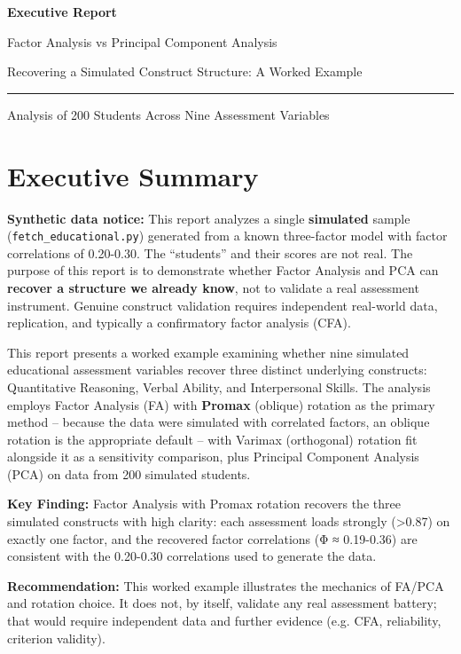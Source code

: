 \documentclass[
]{article}
\author{}
\date{}
\begin{document}
\textbf{ Executive Report }

Factor Analysis vs Principal Component Analysis

Recovering a Simulated Construct Structure: A Worked Example

\begin{center}\rule{0.5\linewidth}{0.5pt}\end{center}

Analysis of 200 Students Across Nine Assessment Variables

\section{Executive Summary}

\textbf{Synthetic data notice:} This report analyzes a single
\textbf{simulated} sample (\texttt{fetch\_educational.py}) generated
from a known three-factor model with factor correlations of 0.20-0.30.
The ``students'' and their scores are not real. The purpose of this
report is to demonstrate whether Factor Analysis and PCA can
\textbf{recover a structure we already know}, not to validate a real
assessment instrument. Genuine construct validation requires independent
real-world data, replication, and typically a confirmatory factor
analysis (CFA).

This report presents a worked example examining whether nine simulated
educational assessment variables recover three distinct underlying
constructs: Quantitative Reasoning, Verbal Ability, and Interpersonal
Skills. The analysis employs Factor Analysis (FA) with \textbf{Promax}
(oblique) rotation as the primary method -- because the data were
simulated with correlated factors, an oblique rotation is the
appropriate default -- with Varimax (orthogonal) rotation fit alongside
it as a sensitivity comparison, plus Principal Component Analysis (PCA)
on data from 200 simulated students.

\textbf{Key Finding:} Factor Analysis with Promax rotation recovers the
three simulated constructs with high clarity: each assessment loads
strongly (\textgreater0.87) on exactly one factor, and the recovered
factor correlations (Φ ≈ 0.19-0.36) are consistent with the 0.20-0.30
correlations used to generate the data.

\textbf{Recommendation:} This worked example illustrates the mechanics
of FA/PCA and rotation choice. It does not, by itself, validate any real
assessment battery; that would require independent data and further
evidence (e.g. CFA, reliability, criterion validity).
\end{document}
